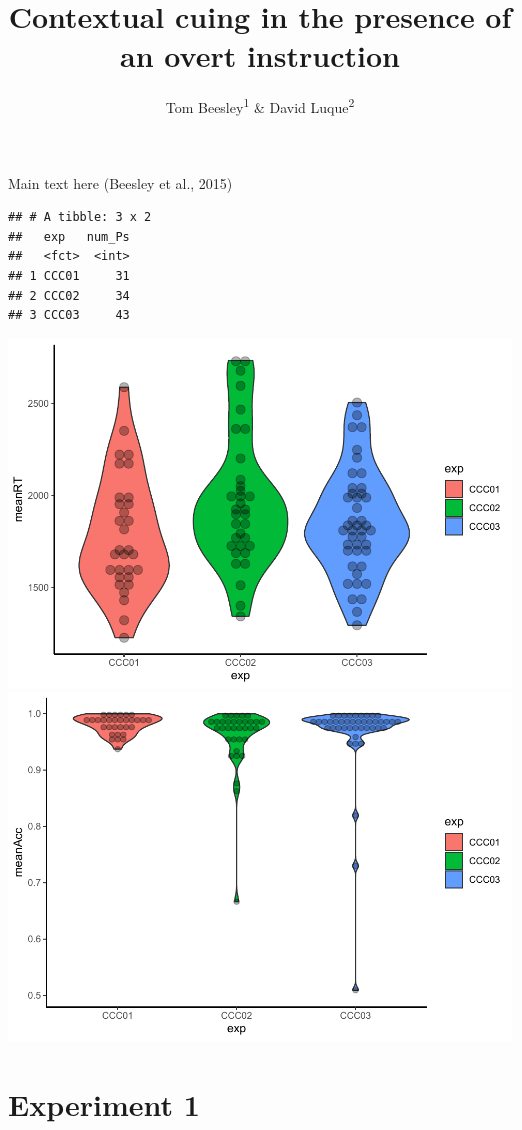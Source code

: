 \documentclass[
  man]{apa6}
\title{Contextual cuing in the presence of an overt instruction}
\author{Tom Beesley\textsuperscript{1} \& David Luque\textsuperscript{2}}
\date{}
\affiliation{\vspace{0.5cm}\textsuperscript{1} Lancaster University, UK\\\textsuperscript{2} Universidad Autónoma de Madrid, Spain}
\begin{document}
\maketitle

Main text here (Beesley et al., 2015)

\begin{verbatim}
## # A tibble: 3 x 2
##   exp   num_Ps
##   <fct>  <int>
## 1 CCC01     31
## 2 CCC02     34
## 3 CCC03     43
\end{verbatim}

\includegraphics{CCC_ms1_files/figure-latex/unnamed-chunk-1-1.pdf} \includegraphics{CCC_ms1_files/figure-latex/unnamed-chunk-1-2.pdf}

\hypertarget{experiment-1}{%
\section{Experiment 1}\label{experiment-1}}
\end{document}
